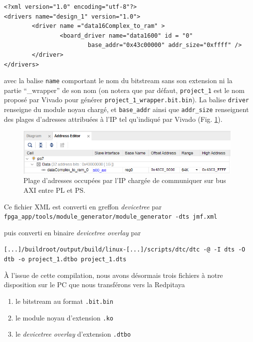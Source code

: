 \documentclass[12pt,oneside]{article}
\begin{document}
\begin{verbatim}
<?xml version="1.0" encoding="utf-8"?>
<drivers name="design_1" version="1.0">
        <driver name ="data16Complex_to_ram" >
                <board_driver name="data1600" id = "0"
                        base_addr="0x43c00000" addr_size="0xffff" />
        </driver>
</drivers>
\end{verbatim}

avec la balise {\tt name} comportant le nom du bitstream sans son extension ni la partie
``\_wrapper'' de son nom (on notera que par d\'efaut, {\tt project\_1} est le nom propos\'e
par Vivado pour g\'en\'erer {\tt project\_1\_wrapper.bit.bin}). La balise {\tt driver}
renseigne du module noyau charg\'e, et {\tt base\_addr} ainsi que {\tt addr\_size}
renseignent des plages d'adresses attribu\'ees \`a l'IP tel qu'indiqu\'e par Vivado
(Fig. \ref{addr}).

\begin{figure}[h!tb]
\includegraphics[width=\linewidth]{adresses}
\caption{Plage d'adresses occup\'ees par l'IP charg\'ee de communiquer sur bus AXI entre
PL et PS.}
\label{addr}
\end{figure}

Ce fichier XML est converti en greffon {\em devicetree} par\\
{\tt fpga\_app/tools/module\_generator/module\_generator -dts jmf.xml}

puis converti en binaire {\em devicetree overlay} par

\hspace*{-2.53cm}
{\footnotesize
\verb~[...]/buildroot/output/build/linux-[...]/scripts/dtc/dtc -@ -I dts -O dtb -o project_1.dtbo project_1.dts~}

\`A l'issue de cette compilation, nous avons d\'esormais trois fichiers \`a notre disposition
sur le PC que nous transf\'erons vers la Redpitaya
\begin{enumerate}
\item le bitstream au format {\tt .bit.bin}
\item le module noyau d'extension {\tt .ko}
\item le {\em devicetree overlay} d'extension {\tt .dtbo}
\end{enumerate}
\end{document}
